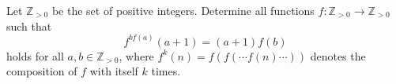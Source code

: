 Let $\mathbb{Z}_{>0}$ be the set of positive integers. Determine all functions $f \colon \mathbb{Z}_{>0} \to \mathbb{Z}_{>0}$ such that
\[
f^{bf(a)}(a+1) = (a+1)f(b)
\]
holds for all $a, b \in \mathbb{Z}_{>0}$, where $f^k(n) = f(f(\cdots f(n) \cdots))$ denotes the composition of $f$ with itself $k$ times.
